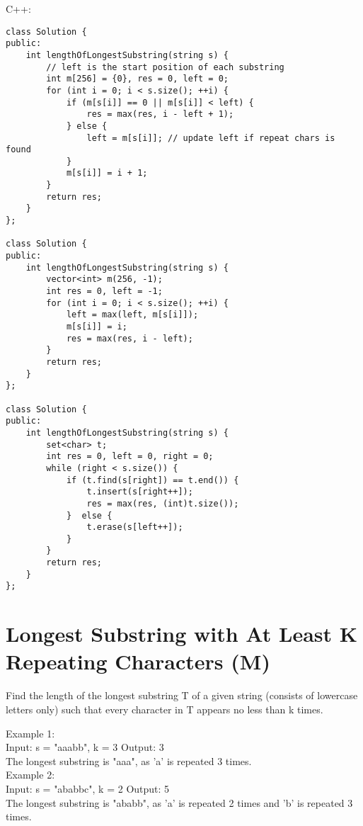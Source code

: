 C++:
\lstset{language=C++}
\begin{lstlisting}
class Solution {
public:
    int lengthOfLongestSubstring(string s) {
        // left is the start position of each substring
        int m[256] = {0}, res = 0, left = 0;
        for (int i = 0; i < s.size(); ++i) {
            if (m[s[i]] == 0 || m[s[i]] < left) {
                res = max(res, i - left + 1);
            } else {
                left = m[s[i]]; // update left if repeat chars is found
            }
            m[s[i]] = i + 1;
        }
        return res;
    }
};

class Solution {
public:
    int lengthOfLongestSubstring(string s) {
        vector<int> m(256, -1);
        int res = 0, left = -1;
        for (int i = 0; i < s.size(); ++i) {
            left = max(left, m[s[i]]);
            m[s[i]] = i;
            res = max(res, i - left);
        }
        return res;
    }
};

class Solution {
public:
    int lengthOfLongestSubstring(string s) {
        set<char> t;
        int res = 0, left = 0, right = 0;
        while (right < s.size()) {
            if (t.find(s[right]) == t.end()) {
                t.insert(s[right++]);
                res = max(res, (int)t.size());
            }  else {
                t.erase(s[left++]);
            }
        }
        return res;
    }
};
\end{lstlisting}


\section{Longest Substring with At Least K Repeating Characters (M)}
Find the length of the longest substring T of a given string (consists of lowercase letters only) such that every character in T appears no less than k times.

Example 1:\\
Input:
s = "aaabb", k = 3
Output:
3\\
The longest substring is "aaa", as 'a' is repeated 3 times.\\

Example 2:\\
Input:
s = "ababbc", k = 2
Output:
5\\
The longest substring is "ababb", as 'a' is repeated 2 times and 'b' is repeated 3 times.\\

